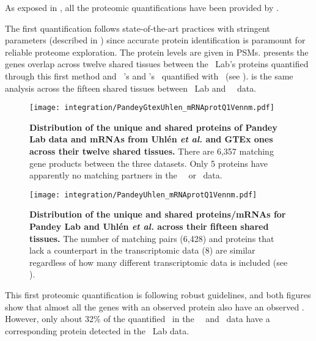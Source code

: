 As exposed in ,
all the proteomic quantifications have been provided by \james.\mybr\

The first quantification follows state-of-the-art practices
with stringent parameters (described in )
since accurate protein identification is paramount
for reliable proteome exploration.
The protein levels are given in \glspl{PSM}.
 presents
the genes overlap across twelve shared tissues
between the \pandey\ Lab's proteins quantified through this first method
and \uhlen\ \etal{}'s and \gtex{}'s \mRNAs\ quantified
with \htseq\ (see ).
 is the same analysis across the fifteen shared tissues
between \pandey\ Lab and \uhlen\ \etal\ data.\mybr\
\vspace{5mm}

\begin{figure}[!htb]
    \texttt{[image: integration/PandeyGtexUhlen\_mRNAprotQ1Vennm.pdf]}\centering
    \caption[Distribution of the unique and shared proteins/mRNAs for the three datasets
    across twelve tissues]{%
    \label{fig:PGU_vennQ1}\textbf{Distribution of the unique and shared proteins
    of Pandey Lab data and mRNAs from Uhlén \textit{et al.} and GTEx ones across
    their twelve shared tissues.}
    There are 6,357 matching gene products between the three datasets.
    Only 5 proteins have apparently no matching partners
    in the \uhlen\ \etal\ or \gtex\ data.}
\end{figure}


\begin{figure}[!htb]
    \texttt{[image: integration/PandeyUhlen\_mRNAprotQ1Vennm.pdf]}\centering
    \caption[Distribution of the unique and shared proteins/mRNAs for Pandey Lab
    and Uhlén \textit{et al.} across fifteen tissues.]{%
    \label{fig:PU_vennQ1}\textbf{Distribution of the unique and shared proteins/mRNAs
    for Pandey Lab and Uhlén \textit{et al.} across their fifteen shared tissues.}
    The number of matching pairs (6,428) and proteins that lack a counterpart in
    the transcriptomic data (8) are similar regardless of how many different
    transcriptomic data is included (see \Cref{fig:PGU_vennQ1}).}
\end{figure}

This first proteomic quantification is following robust guidelines,
and both figures show that
almost all the genes with an observed protein
also have an observed \mRNA{}.
However, only about 32\% of the quantified \mRNAs\
in the \uhlen\ \etal\ and \gtex\ data
have a corresponding protein detected in the \pandey\ Lab data.\mybr\

